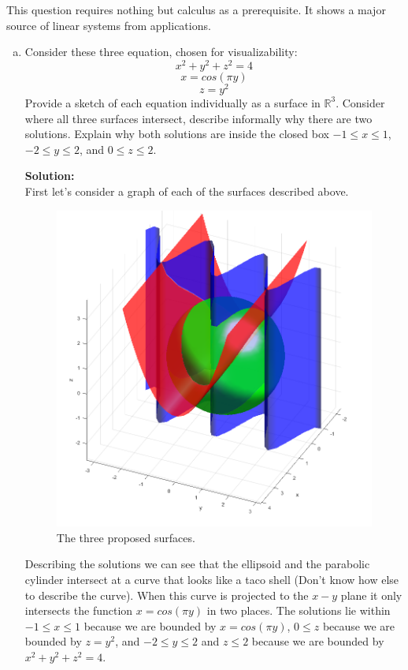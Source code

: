 \documentclass[12pt]{article}
\makeatletter
\theoremstyle{homework}
\newenvironment{exercise}[1]
{\def\@currentlabel{#1}\exercisecore}
{\endexercisecore}
\newcommand{\localhead}[1]{\par\smallskip\noindent\textbf{#1}\nobreak\\}%
\newcommand\solution{\localhead{Solution:}}
\newcommand{\Reals}{\ensuremath{\mathbb R}}
\let\RR\Reals
\makeatother
\begin{document}
\begin{exercise}{P5} This question requires nothing but calculus as a prerequisite. It shows a major source of linear systems from applications.
  \begin{enumerate}[a.]
    \item Consider these three equation, chosen for visualizability:
          \begin{equation*}
            x^2 + y^2 + z^2 = 4
          \end{equation*}
          \begin{equation*}
            x = cos(\pi y)
          \end{equation*}
          \begin{equation*}
            z = y^2
          \end{equation*}
          Provide a sketch of each equation individually as a surface in $\RR^3$. Consider where all three surfaces intersect, describe
          informally why there are two solutions. Explain why both solutions are inside the closed box $-1\leq x \leq 1$, $-2\leq y \leq 2$, and $0\leq z \leq 2$.\\
          \solution First let's consider a graph of each of the surfaces described above.
          \begin{figure}[H]
            \begin{center}
              \caption{The three proposed surfaces.}
              \includegraphics[width=.75\textwidth]{figure1.png}
            \end{center}
          \end{figure}
          Describing the solutions we can see that the ellipsoid and the parabolic cylinder intersect at a curve that looks like a taco shell (Don't know how else to describe the curve).
          When this curve is projected to the $x-y$ plane it only intersects the function $x = cos(\pi y)$ in two places. The solutions lie within $-1\leq x \leq 1$ because we are bounded by $x = cos(\pi y)$,
          $0\leq z$ because we are bounded by $z = y^2$, and $-2\leq y \leq 2$ and $z \leq 2$ because we are bounded by $x^2 + y^2 + z^2 = 4$.
          \vspace{.15in}


\end{enumerate}
\end{exercise}
\end{document}

